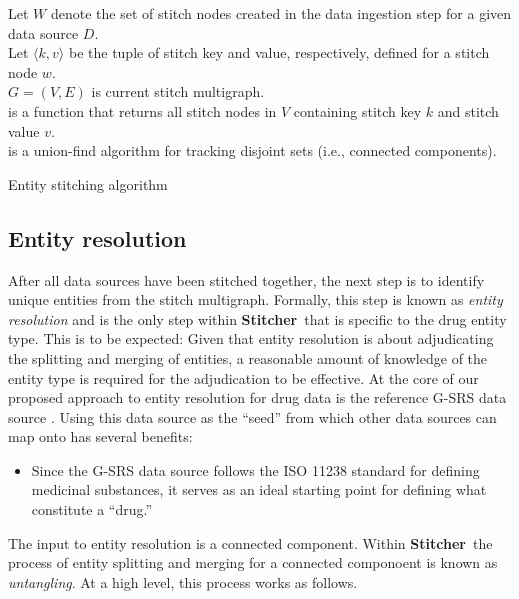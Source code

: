 \documentclass{bioinfo}
\newcommand\st{\textbf{Stitcher}}
\begin{document}
\begin{methods}
\begin{algorithm}\label{algo:stitching}
\SetAlgoLined
\DontPrintSemicolon
Let $W$ denote the set of stitch nodes created in the data ingestion
step for a given data source $D$.\\
Let $\langle k, v\rangle$ be the tuple of stitch key and value,
respectively, defined for a stitch node $w$.\\
$G=(V,E)$ is current stitch multigraph.\\
 is a function that returns all stitch nodes in $V$
containing stitch key $k$ and stitch value $v$.\\
 is a union-find algorithm for tracking disjoint sets
(i.e., connected components).\\
 \caption{Entity stitching algorithm}
\end{algorithm}

\subsection{Entity resolution}\label{sec:methods-er}
After all data sources have been stitched together, the next step is
to identify unique entities from the stitch multigraph. Formally, this
step is known as \emph{entity resolution} and is the only step
within \st\ that is specific to the drug entity type. This is to be
expected: Given that entity resolution is about adjudicating
the splitting and merging of entities, a reasonable amount of
knowledge of the entity type is required for the adjudication to be
effective. At the core of our proposed approach to entity resolution
for drug data is the reference G-SRS data source \citep{GSRSData}.
Using this data source as the ``seed'' from which other data sources
can map onto has several benefits:
\begin{itemize}
\item Since the G-SRS data source follows the ISO 11238
standard \citep{ISO11238} for defining medicinal substances, it serves
as an ideal starting point for defining what constitute a ``drug.''
\end{itemize}

The input to entity resolution is a connected component. Within \st\
the process of entity splitting and merging for a connected componoent
is known as \emph{untangling}. At a high level, this process works as
follows. 


\end{methods}
\end{document}
